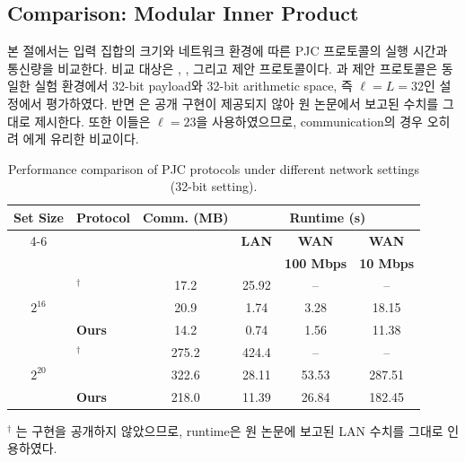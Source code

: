 \documentclass[sigconf,anonymous,review]{acmart}
\begin{document}
\subsection{Comparison: Modular Inner Product}

\label{sec:performance-comparison}
본 절에서는 입력 집합의 크기와 네트워크 환경에 따른
PJC 프로토콜의 실행 시간과 통신량을 비교한다.
비교 대상은 \cite{CHI+23}, \cite{KLS26}, 그리고 제안 프로토콜이다.
\cite{KLS26}과 제안 프로토콜은 동일한 실험 환경에서
32-bit payload와 32-bit arithmetic space, 즉 $\ell=L=32$인 설정에서 평가하였다.
반면 \cite{CHI+23}은 공개 구현이 제공되지 않아 원 논문에서 보고된 수치를 그대로 제시한다.
또한 이들은 $\ell = 23$을 사용하였으므로, communication의 경우 오히려 \cite{CHI+23}에게 유리한 비교이다.



\begin{table}[h]
\centering
\caption{Performance comparison of PJC protocols under different network settings (32-bit setting).}
\label{tab:pjc-comparison}

\setlength{\tabcolsep}{3.5pt}
\renewcommand{\arraystretch}{1.05}
\small

\begin{tabular}{c l c c c c}
\toprule

\multirow{2}{*}{\textbf{Set Size}}
&
\multirow{2}{*}{\textbf{Protocol}}
&
\multirow{2}{*}{\textbf{Comm. (MB)}}
&
\multicolumn{3}{c}{\textbf{Runtime (s)}}
\\

\cmidrule(lr){4-6}

&
&
&
\textbf{LAN}
&
\textbf{WAN}
&
\textbf{WAN}
\\[-2pt]

&
&
&
&
\textbf{100 Mbps}
&
\textbf{10 Mbps}
\\

\midrule

\multirow{3}{*}{$2^{16}$}
& \cite{CHI+23}$^\dagger$& 17.2 & 25.92 & -- & -- \\
& \cite{KLS26}&20.9&1.74&3.28&18.15\\
\cmidrule(lr){2-6}%
& \textbf{Ours}&14.2&0.74&1.56&11.38\\

\midrule

\multirow{3}{*}{$2^{20}$}
& \cite{CHI+23}$^\dagger$& 275.2 & 424.4 & -- & -- \\
& \cite{KLS26}&322.6&28.11&53.53&287.51\\
\cmidrule(lr){2-6}
& \textbf{Ours}&218.0&11.39&26.84&182.45\\

\bottomrule
\end{tabular}

\vspace{2pt}
\begin{minipage}{0.95\linewidth}
\footnotesize
$^\dagger$ \cite{CHI+23}는 구현을 공개하지 않았으므로, runtime은 원 논문에 보고된 LAN 수치를 그대로 인용하였다.
\end{minipage}

\end{table}
\end{document}
